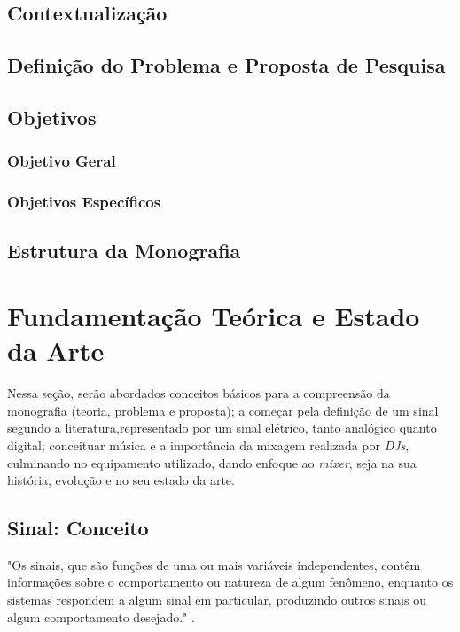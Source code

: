 \section{Contextualização}

\section{Definição do Problema e Proposta de Pesquisa}
\section{Objetivos}
\subsection{Objetivo Geral}
\subsection{Objetivos Específicos}
\section{\textbf{Estrutura da Monografia}}


\chapter[Fundamentação Teórica e Estado da Arte]{Fundamentação Teórica e Estado da Arte}

Nessa seção, serão abordados conceitos básicos para a compreensão da monografia (teoria, problema e proposta); a começar pela definição de um sinal segundo a literatura,representado por um sinal elétrico, tanto analógico quanto digital; conceituar música e a importância da mixagem realizada por \textit{DJs}, culminando no equipamento utilizado, dando enfoque ao \textit{mixer}, seja na sua história, evolução e no seu estado da arte.


\newpage
\section{Sinal: Conceito}

\begin{citacao}
"Os sinais, que são funções de uma ou mais variáveis independentes, contêm informações sobre o comportamento ou natureza de algum fenômeno, enquanto os sistemas respondem a algum sinal em particular, produzindo outros sinais ou algum comportamento desejado." \cite{oppenheim2010sinais}.
\end{citacao}

